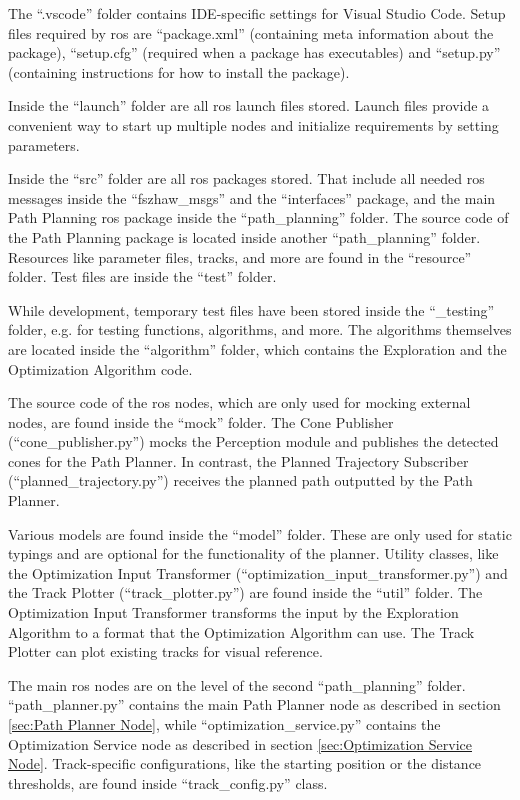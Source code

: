 The ``.vscode'' folder contains IDE-specific settings for Visual Studio Code. \cite{vscode_user_and_workspace_settings}
Setup files required by \acrshort{ros} are ``package.xml'' (containing meta information about the package), ``setup.cfg'' (required when a package has executables) and ``setup.py'' (containing instructions for how to install the package).

Inside the ``launch'' folder are all \acrshort{ros} launch files stored. Launch files provide a convenient way to start up multiple nodes and initialize requirements by setting parameters. \cite{clearpath_robotics_launch_files}

Inside the ``src'' folder are all \acrshort{ros} packages stored. That include all needed \acrshort{ros} messages inside the ``fszhaw\_msgs'' and the ``interfaces'' package, and the main Path Planning \acrshort{ros} package inside the ``path\_planning'' folder.
The source code of the Path Planning package is located inside another ``path\_planning'' folder. Resources like parameter files, tracks, and more are found in the ``resource'' folder. Test files are inside the ``test'' folder.

While development, temporary test files have been stored inside the ``\_testing'' folder, e.g. for testing functions, algorithms, and more.
The algorithms themselves are located inside the ``algorithm'' folder, which contains the Exploration and the Optimization Algorithm code.

The source code of the \acrshort{ros} nodes, which are only used for mocking external nodes, are found inside the ``mock'' folder. The Cone Publisher (``cone\_publisher.py'') mocks the Perception module and publishes the detected cones for the Path Planner. In contrast, the Planned Trajectory Subscriber (``planned\_trajectory.py'') receives the planned path outputted by the Path Planner.

Various models are found inside the ``model'' folder. These are only used for static typings and are optional for the functionality of the planner.
Utility classes, like the Optimization Input Transformer (``optimization\_input\_transformer.py'') and the Track Plotter (``track\_plotter.py'') are found inside the ``util'' folder. The Optimization Input Transformer transforms the input by the Exploration Algorithm to a format that the Optimization Algorithm can use. The Track Plotter can plot existing tracks for visual reference.

The main \acrshort{ros} nodes are on the level of the second ``path\_planning'' folder. ``path\_planner.py'' contains the main Path Planner node as described in section \ref{sec:Path Planner Node}, while ``optimization\_service.py'' contains the Optimization Service node as described in section \ref{sec:Optimization Service Node}.
Track-specific configurations, like the starting position or the distance thresholds, are found inside ``track\_config.py'' class.

